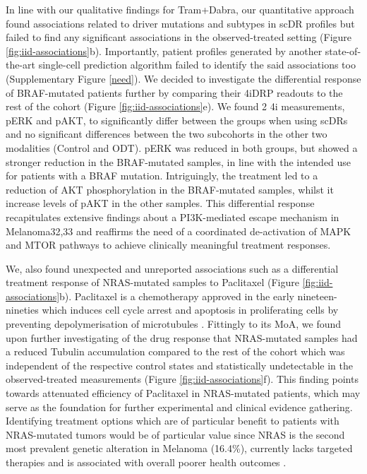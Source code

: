 In line with our qualitative findings for Tram+Dabra, our quantitative approach found associations related to driver mutations and subtypes in scDR profiles but failed to find any significant associations in the observed-treated setting (Figure \ref{fig:iid-associations}b).
 Importantly, patient profiles generated by another state-of-the-art single-cell prediction algorithm failed to identify the said associations too (Supplementary Figure \ref{need}).
 We decided to investigate the differential response of BRAF-mutated patients further by comparing their 4iDRP readouts to the rest of the cohort (Figure \ref{fig:iid-associations}e).
 We found 2 4i measurements, pERK and pAKT, to significantly differ between the groups when using scDRs and no significant differences between the two subcohorts in the other two modalities (Control and ODT).
 pERK was reduced in both groups, but showed a stronger reduction in the BRAF-mutated samples, in line with the intended use for patients with a BRAF mutation.
 Intriguingly, the treatment led to a reduction of AKT phosphorylation in the BRAF-mutated samples, whilst it increase levels of pAKT in the other samples.
 This differential response recapitulates extensive findings about a PI3K-mediated escape mechanism in Melanoma​32,33​ and reaffirms the need of a coordinated de-activation of MAPK and MTOR pathways to achieve clinically meaningful treatment responses. 

We, also found unexpected and unreported associations such as a differential treatment response of NRAS-mutated samples to Paclitaxel (Figure \ref{fig:iid-associations}b).
 Paclitaxel is a chemotherapy approved in the early nineteen-nineties which induces cell cycle arrest and apoptosis in proliferating cells by preventing depolymerisation of microtubules \cite{34}.
 Fittingly to its MoA, we found upon further investigating of the drug response that NRAS-mutated samples had a reduced Tubulin accumulation compared to the rest of the cohort which was independent of the respective control states and statistically undetectable in the observed-treated measurements (Figure \ref{fig:iid-associations}f).
 This finding points towards attenuated efficiency of Paclitaxel in NRAS-mutated patients, which may serve as the foundation for further experimental and clinical evidence gathering.
 Identifying treatment options which are of particular benefit to patients with NRAS-mutated tumors would be of particular value since NRAS is the second most prevalent genetic alteration in Melanoma (16.4\%), currently lacks targeted therapies and is associated with overall poorer health outcomes \cite{35}. 

